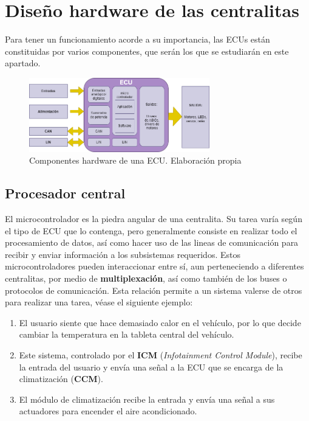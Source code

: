 \section{Diseño hardware de las centralitas}

Para tener un funcionamiento acorde a su importancia, las ECUs están constituidas por varios componentes, que serán los que se estudiarán en este apartado.

\begin{figure}[h]
    \centering
    \includegraphics[width=0.70\textwidth]{imagenes/ECU_hardware.png}
    \caption{Componentes hardware de una ECU. Elaboración propia}
\end{figure}

\subsection{Procesador central}
El microcontrolador es la piedra angular de una centralita. Su tarea varía según el tipo de ECU que lo contenga, pero generalmente consiste en realizar todo el procesamiento de datos, así como hacer uso de las lineas de comunicación para recibir y enviar información a los subsistemas requeridos. \newline
Estos microcontroladores pueden interaccionar entre sí, aun perteneciendo a diferentes centralitas, por medio de \textbf{multiplexación}, así como también de los buses o protocolos de comunicación. Esta relación permite a un sistema valerse de otros para realizar una tarea, véase el siguiente ejemplo: 

\begin{enumerate}
    \item El usuario siente que hace demasiado calor en el vehículo, por lo que decide cambiar la temperatura en la tableta central del vehículo.
    \item Este sistema, controlado por el \textbf{ICM} (\textit{Infotainment Control Module}), recibe la entrada del usuario y envía una señal a la ECU que se encarga de la climatización (\textbf{CCM}).
    \item El módulo de climatización recibe la entrada y envía una señal a sus actuadores para encender el aire acondicionado.
\end{enumerate}


